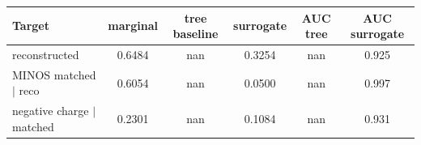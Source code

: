 \begin{tabular}{lccccc}
\toprule
Target & marginal & tree baseline & surrogate & AUC tree & AUC surrogate \\
\midrule
reconstructed & 0.6484 & nan & 0.3254 & nan & 0.925 \\
MINOS matched $\mid$ reco & 0.6054 & nan & 0.0500 & nan & 0.997 \\
negative charge $\mid$ matched & 0.2301 & nan & 0.1084 & nan & 0.931 \\
\bottomrule
\end{tabular}
